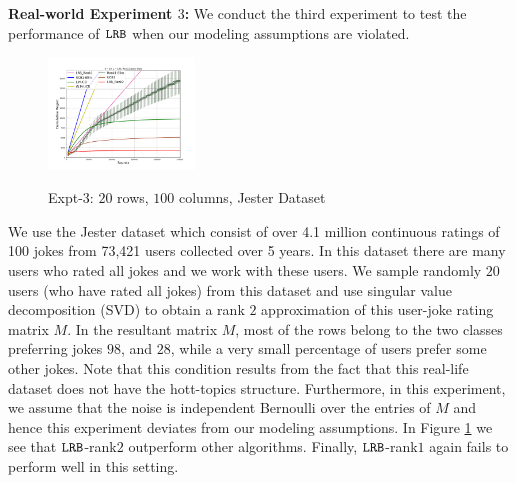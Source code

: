 \textbf{Real-world Experiment $3$:} We conduct the third experiment to test the performance of ${\tt LRB}$ when our modeling assumptions are violated. 
\begin{figure}
    {
            \includegraphics[trim={1cm 1cm 1cm 1cm},clip,width=3.9cm]{img/Figure_L4.png}
   }
 \caption{Expt-$3$: $20$ rows, $100$ columns, Jester Dataset}
 \label{fig:6}
 \vspace{-1.2em}
\end{figure}
We use the Jester dataset \citep{goldberg2001eigentaste} which consist of over 4.1 million continuous ratings of 100 jokes from 73,421 users collected over 5 years. In this dataset there are many users who rated all jokes and we work with these users. We sample randomly $20$ users (who have rated all jokes) from this dataset and use singular value decomposition (SVD) to obtain a rank $2$ approximation of this user-joke rating matrix $M$. In the resultant matrix $M$, most of the rows belong to the two classes preferring jokes $98$, and $28$, while a very small percentage of users prefer some other jokes. Note that this condition results from the fact that this real-life dataset does not have the hott-topics structure. Furthermore, in this experiment, we assume that the noise is independent Bernoulli over the entries of $M$ and hence this experiment deviates from our modeling assumptions. In Figure \ref{fig:6} we see that ${\tt LRB}$-rank$2$ outperform other algorithms. Finally, ${\tt LRB}$-rank$1$ again fails to perform well in this setting.


